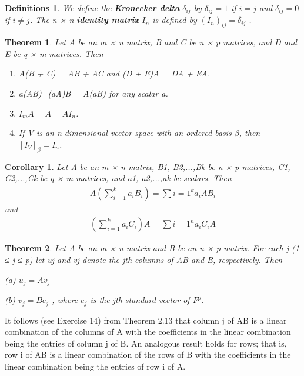 \documentclass{article}
\newcommand{\bd}[1]{\textbf{#1}}
\theoremstyle{plain}
\newtheorem{theorem}{Theorem}[section]
\newtheorem*{corollary}{Corollary}
\newtheorem*{definitions}{Definitions}
\theoremstyle{plain} %
\begin{document}
\begin{definitions}
We define the \bd{Kronecker delta} $\delta_{ij}$ by $\delta_{ij} = 1$ if $i = j$ and $\delta_{ij} = 0$ if $i \neq j$. The n × n \bd{identity matrix} $I_n$ is defined by $(I_n)_{ij} = \delta_{ij}$ .
\end{definitions}

\begin{theorem}
Let A be an m × n matrix, B and C be n × p matrices, and D and E be q × m matrices. Then
\begin{enumerate}[label=(\alph*)]
\item A(B + C) = AB + AC and (D + E)A = DA + EA.
\item a(AB)=(aA)B = A(aB) for any scalar a.
\item $I_mA = A = AI_n$.
\item If V is an n-dimensional vector space with an ordered basis $\beta$, then $[I_V]_\beta = I_n$.
\end{enumerate}
\end{theorem}

\begin{corollary}
Let A be an m × n matrix, B1, B2,...,Bk be n × p matrices, C1, C2,...,Ck be q × m matrices, and a1, a2,...,ak be scalars. Then
\begin{align*}
A\left(\sum_{i=1}^ka_iB_i\right)=\sum{i=1}^ka_iAB_i
\end{align*}
and
\begin{align*}
\left(\sum_{i=1}^ka_iC_i\right)A=\sum{i=1}^na_iC_iA
\end{align*}
\end{corollary}

\begin{theorem}
Let A be an m × n matrix and B be an n × p matrix. For each j (1 ≤ j ≤ p) let uj and vj denote the jth columns of AB and B, respectively. Then

(a) $u_j = Av_j$

(b) $v_j = Be_j$ , where $e_j$ is the jth standard vector of $F^p$.

\end{theorem}

It follows (see Exercise 14) from Theorem 2.13 that column j of AB is a linear combination of the columns of A with the coefficients in the linear combination being the entries of column j of B. An analogous result holds for rows; that is, row i of AB is a linear combination of the rows of B with the coefficients in the linear combination being the entries of row i of A.
\end{document}

